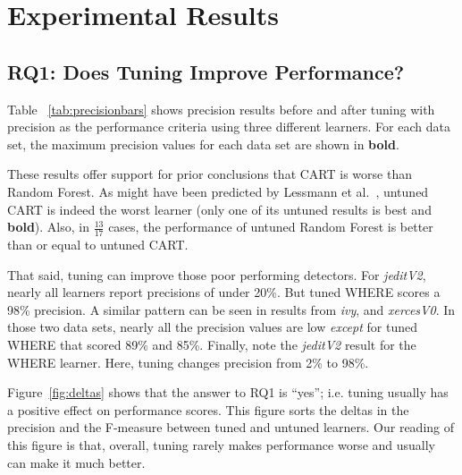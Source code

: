\documentclass{sig-alternative}
\newcommand{\fig}[1]{Figure~\ref{fig:#1}}
\newcommand{\tab}[1]{Table ~\ref{tab:#1}}
\begin{document}
\section{Experimental Results}
\subsection{RQ1:  Does  Tuning  Improve Performance? }\label{sect:precision}

\tab{precisionbars} shows precision results before and after tuning with precision as the performance criteria 
using three different learners.
For each data set, the maximum precision values for each data set are shown in {\bf bold}.

These results offer support for  prior conclusions that CART is worse than Random Forest. As might have been
 predicted by Lessmann et al.~\cite{lessmann2008benchmarking}, 
untuned CART is indeed the worst learner (only one of its
untuned results is best and {\bf bold}). 
Also, 
in $\frac{13}{17}$ cases, the performance of untuned Random Forest is better than or equal to untuned CART.  

That said,  tuning can improve those poor performing detectors.
For {\em jeditV2}, nearly all learners report precisions of under 20\%. But tuned  WHERE scores a 98\% precision.  
A similar pattern can be seen in results from {\em ivy},   and {\em xercesV0}.
In those two data sets, nearly all the precision values are   low {\em except} for
tuned WHERE that scored 89\% and 85\%.
Finally, note the  {\em jeditV2} result for the WHERE learner.
Here, tuning changes precision from 2\% to 98\%.

\fig{deltas} shows that the answer to RQ1 is ``yes''; i.e. tuning usually has a positive effect on performance scores. This figure sorts
the deltas in the precision and the F-measure    between tuned and untuned learners. Our reading of this
figure is that, overall, tuning rarely makes performance   worse and usually can make it much better. 
 
\end{document}
